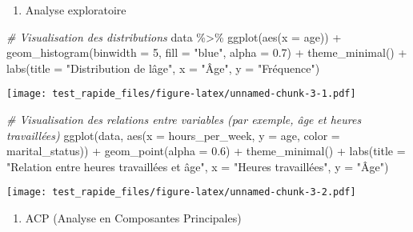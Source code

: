\documentclass[
]{article}
\newenvironment{Shaded}{\begin{snugshade}}{\end{snugshade}}
\newcommand{\AttributeTok}[1]{\textcolor[rgb]{0.77,0.63,0.00}{#1}}
\newcommand{\CommentTok}[1]{\textcolor[rgb]{0.56,0.35,0.01}{\textit{#1}}}
\newcommand{\DecValTok}[1]{\textcolor[rgb]{0.00,0.00,0.81}{#1}}
\newcommand{\FloatTok}[1]{\textcolor[rgb]{0.00,0.00,0.81}{#1}}
\newcommand{\FunctionTok}[1]{\textcolor[rgb]{0.00,0.00,0.00}{#1}}
\newcommand{\NormalTok}[1]{#1}
\newcommand{\SpecialCharTok}[1]{\textcolor[rgb]{0.00,0.00,0.00}{#1}}
\newcommand{\StringTok}[1]{\textcolor[rgb]{0.31,0.60,0.02}{#1}}
\providecommand{\tightlist}{%
  \setlength{\itemsep}{0pt}\setlength{\parskip}{0pt}}
\begin{document}
\begin{enumerate}
\def\labelenumi{\arabic{enumi}.}
\setcounter{enumi}{1}
\tightlist
\item
  Analyse exploratoire
\end{enumerate}

\begin{Shaded}
\begin{Highlighting}[]
\CommentTok{\# Visualisation des distributions}
\NormalTok{data }\SpecialCharTok{\%\textgreater{}\%}
  \FunctionTok{ggplot}\NormalTok{(}\FunctionTok{aes}\NormalTok{(}\AttributeTok{x =}\NormalTok{ age)) }\SpecialCharTok{+}
  \FunctionTok{geom\_histogram}\NormalTok{(}\AttributeTok{binwidth =} \DecValTok{5}\NormalTok{, }\AttributeTok{fill =} \StringTok{"blue"}\NormalTok{, }\AttributeTok{alpha =} \FloatTok{0.7}\NormalTok{) }\SpecialCharTok{+}
  \FunctionTok{theme\_minimal}\NormalTok{() }\SpecialCharTok{+}
  \FunctionTok{labs}\NormalTok{(}\AttributeTok{title =} \StringTok{"Distribution de l\textquotesingle{}âge"}\NormalTok{, }\AttributeTok{x =} \StringTok{"Âge"}\NormalTok{, }\AttributeTok{y =} \StringTok{"Fréquence"}\NormalTok{)}
\end{Highlighting}
\end{Shaded}

\texttt{[image: test\_rapide\_files/figure-latex/unnamed-chunk-3-1.pdf]}

\begin{Shaded}
\begin{Highlighting}[]
\CommentTok{\# Visualisation des relations entre variables (par exemple, âge et heures travaillées)}
\FunctionTok{ggplot}\NormalTok{(data, }\FunctionTok{aes}\NormalTok{(}\AttributeTok{x =}\NormalTok{ hours\_per\_week, }\AttributeTok{y =}\NormalTok{ age, }\AttributeTok{color =}\NormalTok{ marital\_status)) }\SpecialCharTok{+}
  \FunctionTok{geom\_point}\NormalTok{(}\AttributeTok{alpha =} \FloatTok{0.6}\NormalTok{) }\SpecialCharTok{+}
  \FunctionTok{theme\_minimal}\NormalTok{() }\SpecialCharTok{+}
  \FunctionTok{labs}\NormalTok{(}\AttributeTok{title =} \StringTok{"Relation entre heures travaillées et âge"}\NormalTok{, }\AttributeTok{x =} \StringTok{"Heures travaillées"}\NormalTok{, }\AttributeTok{y =} \StringTok{"Âge"}\NormalTok{)}
\end{Highlighting}
\end{Shaded}

\texttt{[image: test\_rapide\_files/figure-latex/unnamed-chunk-3-2.pdf]}

\begin{enumerate}
\def\labelenumi{\arabic{enumi}.}
\setcounter{enumi}{2}
\tightlist
\item
  ACP (Analyse en Composantes Principales)
\end{enumerate}
\end{document}
